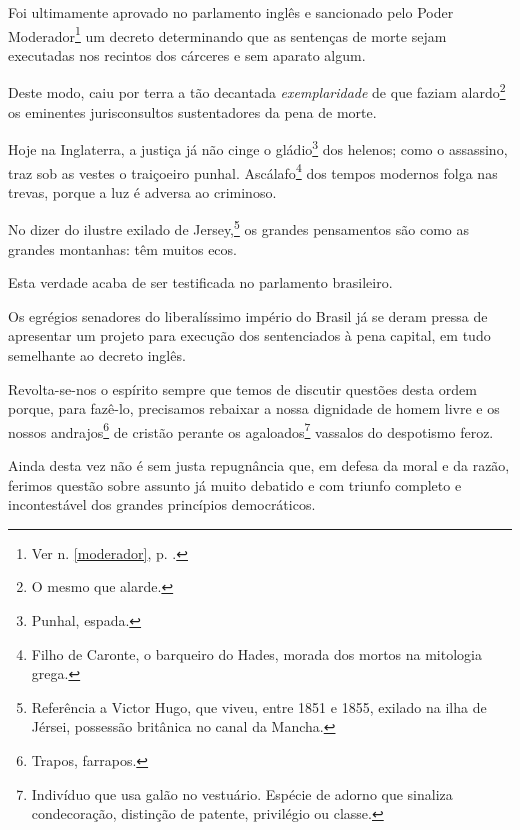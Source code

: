 



Foi ultimamente aprovado no parlamento inglês e sancionado pelo Poder
Moderador\footnote{Ver n. \ref{moderador}, p. \pageref{moderador}.} 
um decreto determinando que as sentenças de morte sejam executadas nos 
recintos dos cárceres e sem aparato algum.

Deste modo, caiu por terra a tão decantada \emph{exemplaridade} de que
faziam alardo\footnote{O mesmo que alarde.} os eminentes
jurisconsultos sustentadores da pena de morte.

Hoje na Inglaterra, a justiça já não cinge o gládio\footnote{Punhal,
  espada.} dos helenos; como o assassino, traz sob as vestes o
traiçoeiro punhal. Ascálafo\footnote{Filho de Caronte, o barqueiro do Hades, morada dos mortos na mitologia grega.} dos tempos modernos
folga nas trevas, porque a luz é adversa ao criminoso.

No dizer do ilustre exilado de Jersey,\footnote{Referência a
  Victor Hugo, que viveu, entre 1851 e 1855, exilado na ilha de Jérsei,
  possessão britânica no canal da Mancha.} os grandes pensamentos são
como as grandes montanhas: têm muitos ecos.

Esta verdade acaba de ser testificada no parlamento brasileiro.

Os egrégios senadores do liberalíssimo império do Brasil já se deram
pressa de apresentar um projeto para execução dos sentenciados à pena
capital, em tudo semelhante ao decreto inglês.

Revolta-se-nos o espírito sempre que temos de discutir questões desta
ordem porque, para fazê-lo, precisamos rebaixar a nossa dignidade de
homem livre e os nossos andrajos\footnote{Trapos, farrapos.} de
cristão perante os agaloados\footnote{Indivíduo que usa galão no
  vestuário. Espécie de adorno que sinaliza condecoração, distinção de
  patente, privilégio ou classe.} vassalos do despotismo feroz.

Ainda desta vez não é sem justa repugnância que, em defesa da moral e da
razão, ferimos questão sobre assunto já muito debatido e com triunfo
completo e incontestável dos grandes princípios democráticos.

